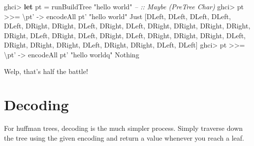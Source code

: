 \documentclass[]{article}
\newenvironment{Shaded}{\begin{snugshade}}{\end{snugshade}}
\newcommand{\CommentTok}[1]{\textcolor[rgb]{0.56,0.35,0.01}{\textit{#1}}}
\newcommand{\DataTypeTok}[1]{\textcolor[rgb]{0.13,0.29,0.53}{#1}}
\newcommand{\FunctionTok}[1]{\textcolor[rgb]{0.00,0.00,0.00}{#1}}
\newcommand{\KeywordTok}[1]{\textcolor[rgb]{0.13,0.29,0.53}{\textbf{#1}}}
\newcommand{\NormalTok}[1]{#1}
\newcommand{\OtherTok}[1]{\textcolor[rgb]{0.56,0.35,0.01}{#1}}
\newcommand{\StringTok}[1]{\textcolor[rgb]{0.31,0.60,0.02}{#1}}
\begin{document}
\begin{Shaded}
\begin{Highlighting}[]
\NormalTok{ghci}\FunctionTok{>} \KeywordTok{let}\NormalTok{ pt }\FunctionTok{=}\NormalTok{ runBuildTree }\StringTok{"hello world"}          \CommentTok{-- :: Maybe (PreTree Char)}
\NormalTok{ghci}\FunctionTok{>}\NormalTok{ pt }\FunctionTok{>>=}\NormalTok{ \textbackslash{}pt' }\OtherTok{->}\NormalTok{ encodeAll pt' }\StringTok{"hello world"}
\DataTypeTok{Just}\NormalTok{ [}\DataTypeTok{DLeft}\NormalTok{, }\DataTypeTok{DLeft}\NormalTok{, }\DataTypeTok{DLeft}\NormalTok{, }\DataTypeTok{DLeft}\NormalTok{, }\DataTypeTok{DLeft}\NormalTok{, }\DataTypeTok{DRight}\NormalTok{, }\DataTypeTok{DRight}\NormalTok{, }\DataTypeTok{DLeft}\NormalTok{, }\DataTypeTok{DRight}\NormalTok{, }\DataTypeTok{DLeft}\NormalTok{,}
\DataTypeTok{DRight}\NormalTok{, }\DataTypeTok{DRight}\NormalTok{, }\DataTypeTok{DRight}\NormalTok{, }\DataTypeTok{DRight}\NormalTok{, }\DataTypeTok{DRight}\NormalTok{, }\DataTypeTok{DLeft}\NormalTok{, }\DataTypeTok{DRight}\NormalTok{, }\DataTypeTok{DLeft}\NormalTok{, }\DataTypeTok{DRight}\NormalTok{, }\DataTypeTok{DLeft}\NormalTok{,}
\DataTypeTok{DRight}\NormalTok{, }\DataTypeTok{DRight}\NormalTok{, }\DataTypeTok{DRight}\NormalTok{, }\DataTypeTok{DLeft}\NormalTok{, }\DataTypeTok{DRight}\NormalTok{, }\DataTypeTok{DRight}\NormalTok{, }\DataTypeTok{DRight}\NormalTok{, }\DataTypeTok{DLeft}\NormalTok{, }\DataTypeTok{DRight}\NormalTok{, }\DataTypeTok{DRight}\NormalTok{,}
\DataTypeTok{DLeft}\NormalTok{, }\DataTypeTok{DLeft}\NormalTok{]}
\NormalTok{ghci}\FunctionTok{>}\NormalTok{ pt }\FunctionTok{>>=}\NormalTok{ \textbackslash{}pt' }\OtherTok{->}\NormalTok{ encodeAll pt' }\StringTok{"hello worldq"}
\DataTypeTok{Nothing}
\end{Highlighting}
\end{Shaded}

Welp, that's half the battle!

\hypertarget{decoding}{%
\section{Decoding}\label{decoding}}

For huffman trees, decoding is the much simpler process. Simply traverse down
the tree using the given encoding and return a value whenever you reach a leaf.
\end{document}
